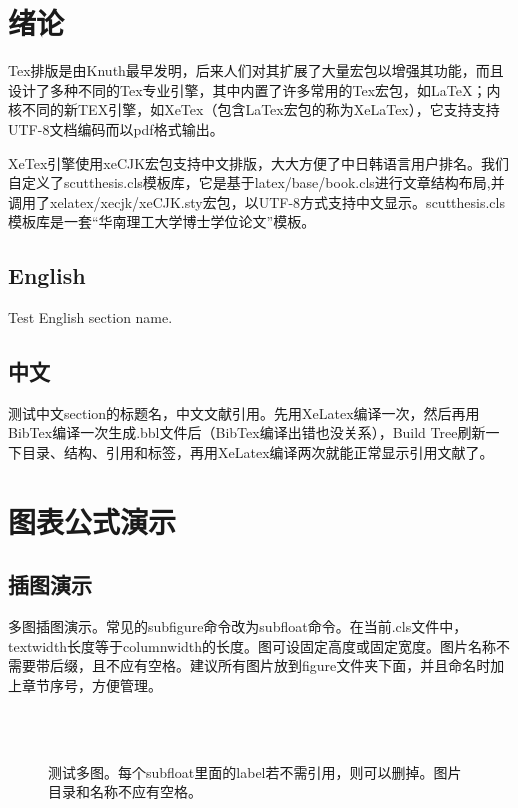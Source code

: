 \documentclass[unicode,pdfcover]{scutthesis}
\begin{document}

\mainmatter

\chapter{绪论}
Tex排版\cite{knuth1986thetexbook}是由Knuth最早发明，后来人们对其扩展了大量宏包以增强其功能，而且设计了多种不同的Tex专业引擎，其中内置了许多常用的Tex宏包，如\LaTeX{}\cite{goossens1994thelatex}；内核不同的新TEX引擎，如XeTex（包含LaTex宏包的称为XeLaTex），它支持支持UTF-8文档编码而以pdf格式输出。

XeTex引擎使用xeCJK宏包支持中文排版，大大方便了中日韩语言用户排名。我们自定义了scutthesis.cls模板库，它是基于latex/base/book.cls进行文章结构布局,并调用了xelatex/xecjk/xeCJK.sty宏包，以UTF-8方式支持中文显示。scutthesis.cls模板库是一套“华南理工大学博士学位论文”模板。

\section{English}
Test English section name.

\section{中文}
测试中文section的标题名，中文文献引用\cite{cnproceed, wang_model_2009}。先用XeLatex编译一次，然后再用BibTex编译一次生成.bbl文件后（BibTex编译出错也没关系），Build Tree刷新一下目录、结构、引用和标签，再用XeLatex编译两次就能正常显示引用文献了。

\chapter{图表公式演示}
\section{插图演示}
多图插图演示。常见的subfigure命令改为subfloat命令。在当前.cls文件中，textwidth长度等于columnwidth的长度。图可设固定高度或固定宽度。图片名称不需要带后缀，且不应有空格。建议所有图片放到figure文件夹下面，并且命名时加上章节序号，方便管理。
\begin{figure}[htp]%
  \centering%
  \hspace{5mm}%
  \\%
  \hspace{5mm}
  \\
  \caption{测试多图。每个subfloat里面的label若不需引用，则可以删掉。图片目录和名称不应有空格。}
  \label{FIG-3-CM}
\end{figure}
\end{document}

